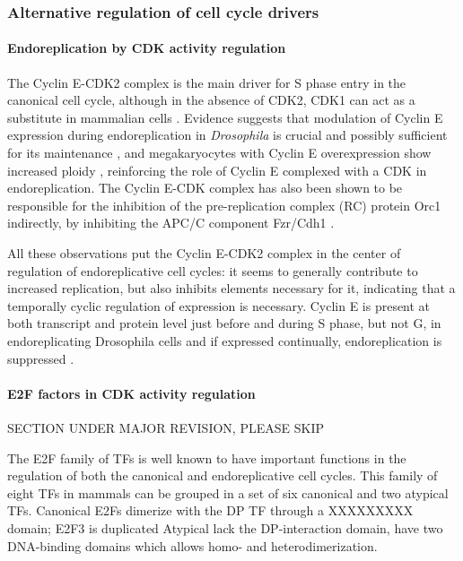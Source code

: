 \documentclass[11pt,twoside,a4paper]{report}
\begin{document}
			\subsubsection{Alternative regulation of cell cycle drivers}
			
				\paragraph{Endoreplication by CDK activity regulation}
			
				The Cyclin E-CDK2 complex is the main driver for S phase entry in the canonical cell cycle, although in the absence of CDK2, CDK1 can act as a substitute in mammalian cells \cite{Ullah2009}. Evidence suggests that modulation of Cyclin E expression during endoreplication in \textit{Drosophila} is crucial and possibly sufficient for its maintenance \cite{Lilly2005}, and megakaryocytes with Cyclin E overexpression show increased ploidy \cite{Eliades2010}, reinforcing the role of Cyclin E complexed with a CDK in endoreplication. The Cyclin E-CDK complex has also been shown to be responsible for the inhibition of the pre-replication complex (RC) protein Orc1 indirectly, by inhibiting the APC/C component Fzr/Cdh1 \cite{Narbonne-Reveau2008}.
			
				All these observations put the Cyclin E-CDK2 complex in the center of regulation of endoreplicative cell cycles: it seems to generally contribute to increased replication, but also inhibits elements necessary for it, indicating that a temporally cyclic regulation of expression is necessary. Cyclin E is present at both transcript and protein level just before and during S phase, but not G, in endoreplicating Drosophila cells \cite{Weng2003} and if expressed continually, endoreplication is suppressed \cite{Weiss}.
			
				\paragraph{E2F factors in CDK activity regulation}
				\label{paragraph:E2Fs}
				SECTION UNDER MAJOR REVISION, PLEASE SKIP
			
				 The E2F family of TFs is well known to have important functions in the regulation of both the canonical and endoreplicative cell cycles. This family of eight TFs in mammals can be grouped in a set of six canonical and two atypical TFs.
				 Canonical E2Fs dimerize with the DP TF through a XXXXXXXXX domain; E2F3 is duplicated
				 Atypical lack the DP-interaction domain, have two DNA-binding domains which allows homo- and heterodimerization.
							
\end{document}
